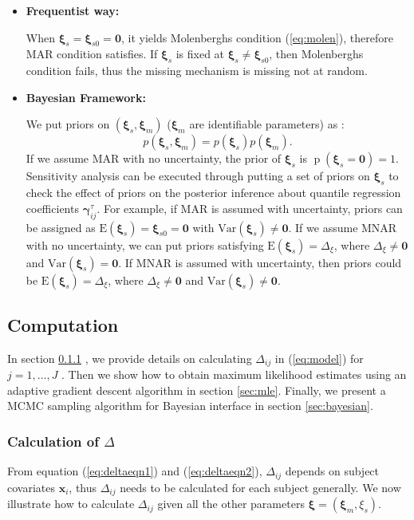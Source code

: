 \documentclass[12pt]{article}
\DeclareMathOperator{\pr}{p}
\begin{document}
\begin{itemize}
\item \textbf{Frequentist way: }

  When $\bm \xi_s = \bm \xi_{s0} = \bm 0$, it yields Molenberghs
  condition (\ref{eq:molen}), therefore MAR condition satisfies. If
  $\bm \xi_s$ is fixed at $\bm \xi_s \neq \bm \xi_{s0}$, then
  Molenberghs condition fails, thus the missing mechanism is missing
  not at random.
\item \textbf{Bayesian Framework: }

  We put priors on $(\bm \xi_s, \bm \xi_m)$ ($\bm \xi_m$ are
  identifiable parameters) as :
  \begin{displaymath}
    p(\bm \xi_s, \bm \xi_m) = p(\bm \xi_s) p(\bm \xi_m).
  \end{displaymath} 
  If we assume MAR with no uncertainty, the prior of $\bm \xi_s$ is
  $\pr(\bm \xi_s = \bm 0) = 1$. Sensitivity analysis can be executed
  through putting a set of priors on $\bm \xi_s$ to check the effect
  of priors on the posterior inference about quantile regression
  coefficients $\bm \gamma_{ij}^{\tau}$. For example, if MAR is
  assumed with uncertainty, priors can be assigned as $\textrm{E}(\bm
  \xi_s) = \bm \xi_{s0} = \bm 0$ with $\textrm{Var}(\bm \xi_s) \neq
  \bm 0$. If we assume MNAR with no uncertainty, we can put priors
  satisfying $\textrm{E}(\bm \xi_s) = \Delta_{\xi}$, where
  $\Delta_{\xi} \neq \bm 0$ and $\textrm{Var}(\bm \xi_s) = \bm 0$. If
  MNAR is assumed with uncertainty, then priors could be
  $\textrm{E}(\bm \xi_s) = \Delta_{\xi}$, where $\Delta_{\xi} \neq \bm
  0 $ and $\textrm{Var}(\bm \xi_s) \neq \bm 0$.
\end{itemize}

\subsection{Computation}
\label{sec:computation}

In section \ref{sec:deltacal} , we provide details on  calculating
$\Delta_{ij}$ in  (\ref{eq:model}) for $j = 1, \ldots, J$ . Then
we show how to obtain maximum likelihood estimates using an adaptive
gradient descent algorithm in section \ref{sec:mle}. Finally, we present
a MCMC  sampling algorithm  for Bayesian interface in section \ref{sec:bayesian}.

\subsubsection{Calculation of $\Delta$ }
\label{sec:deltacal}
From equation (\ref{eq:deltaeqn1}) and (\ref{eq:deltaeqn2}),
$\Delta_{ij}$ depends on subject covariates $\bm x_i$, thus
$\Delta_{ij}$ needs to be calculated for each subject generally. We
now illustrate how to calculate $\Delta_{ij}$ given all the other
parameters $\bm \xi = (\bm \xi_m, \xi_s)$.
\end{document}
